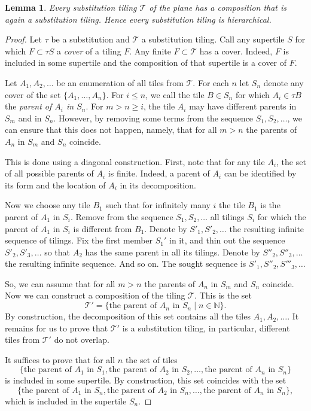 \documentclass[12pt]{article}
\newtheorem{lemma}{Lemma}
\theoremstyle{remark}
\newcommand{\N}{\mathbb N}
\begin{document}
\begin{lemma}\label{th11}
Every substitution tiling $\mathcal{T}$ of the plane
 has a composition that is
again a substitution tiling.
Hence every substitution tiling is hierarchical.
\end{lemma}
\begin{proof}
Let $\tau$ be a substitution and $\mathcal{T}$ a substitution tiling.
Call any supertile $S$ for which
$F\subset\tau S$
a \emph{cover} of a tiling $F$.
Any finite $F\subset \mathcal T$ has a cover. Indeed,
$F$ is included in some supertile and
the composition of that supertile is a cover of $F$.

Let
$A_1,A_2,\dots$  be an enumeration of all tiles from $\mathcal T$.  For each $n$
let $S_n$ denote  any cover  of the set $\{A_1,\dots, A_n\}$.
For $i\le n$, we call the tile $B\in S_n$ for which $A_i\in \tau B$  the \emph{parent of $A_i$ in $S_n$}. For $m>n\ge i$, the tile
$A_i$ may have different parents in $S_m$ and in $S_n$.
However, by removing some terms from the sequence $S_1,S_2,\dots$, we can
ensure that this does not happen, namely, that for all $m> n$
the parents of $A_n$ in $S_m$ and $S_n$ coincide.

This is done using a diagonal construction. First, note that
for any tile $A_i$, the set of all possible parents of $A_i$ is finite. Indeed, a parent of $A_i$
can be identified by its form and the location of  $A_i$ in its decomposition.

Now we choose any tile $B_1$ such that for 
infinitely many $i$ the tile $B_1$ is the parent  of $A_1$  in
$S_i$. Remove from the sequence
$S_ 1,S_2,\dots$ all tilings $S_i$ for which the parent of $A_1$ in
$S_i$ is different from $B_1$. Denote by
$S'_1,S'_2,\dots$
the resulting infinite sequence of tilings.
Fix the first member $S_1'$ in it, and
thin out the sequence $S'_2,S'_3,\dots$ so that $A_2$ has
the same parent in all its tilings.
Denote by
$S''_2,S''_3,\dots$
the resulting infinite sequence. And so on. The sought sequence is $S'_1,S''_2,S'''_3,\dots$

So, we can
assume that for all $m> n$
the parents of $A_n$ in $S_m$ and $S_n$ coincide.
Now we can construct a composition of the tiling $\mathcal T$.
This is the set
$$
\mathcal T'=\{\text{the parent of }A_n\text{ in }S_n\mid n\in\N\}.
$$
By construction, the decomposition of this set contains
all the tiles $A_1,A_2,\dots$. It remains for us to prove
that $\mathcal T'$ is a substitution tiling,
in particular, different tiles from $\mathcal T'$ do not overlap.

It suffices to prove that for all $n$ the set
of tiles
$$
\{\text{the parent of }A_1 \text{ in }S_1,
\text{the parent of }A_2 \text{ in }S_2,\dots,
\text{the parent of }A_n \text{ in }S_n\}
$$
is included in some supertile.
By construction, this set
coincides with the set
$$
\{\text{the parent of }A_1 \text{ in }S_n,
\text{the parent of }A_2 \text{ in }S_n,\dots,
\text{the parent of }A_n \text{ in }S_n\},
$$
which is included in the supertile $S_n$.
\end{proof}
\end{document}
